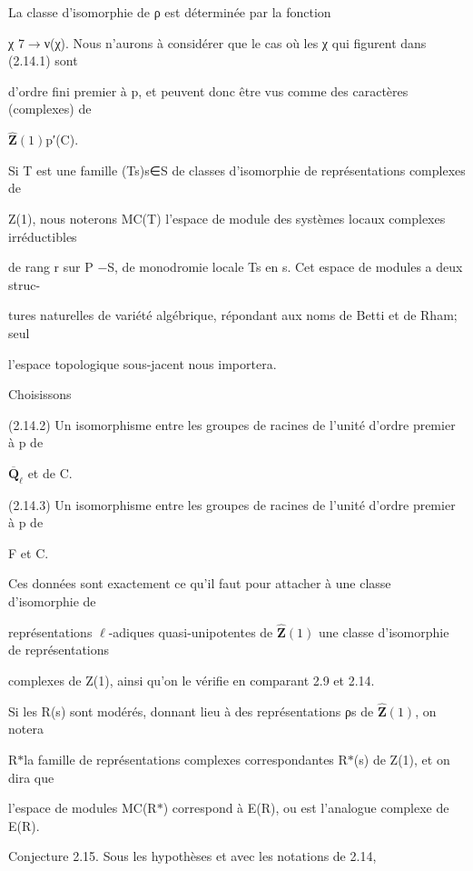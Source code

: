 \documentclass[11pt]{article}
\begin{document}
\noindent La classe d’isomorphie de ρ est déterminée par la fonction\par
\noindent χ 7\(\to\)ν(χ). Nous n’aurons à considérer que le cas où les χ qui figurent dans (2.14.1) sont\par
\noindent d’ordre fini premier à p, et peuvent donc être vus comme des caractères (complexes) de\par
\noindent \(\widehat{\mathbf Z}(1)\)p′(C).\par
\noindent Si T est une famille (Ts)s∈S de classes d’isomorphie de représentations complexes de\par
\noindent Z(1), nous noterons MC(T) l’espace de module des systèmes locaux complexes irréductibles\par
\noindent de rang r sur P −S, de monodromie locale Ts en s. Cet espace de modules a deux struc-\par
\noindent tures naturelles de variété algébrique, répondant aux noms de Betti et de Rham; seul\par
\noindent l’espace topologique sous-jacent nous importera.\par
\noindent Choisissons\par
\noindent (2.14.2) Un isomorphisme entre les groupes de racines de l’unité d’ordre premier à p de\par
\noindent \(\overline{\mathbf Q}_{\ell}\) et de C.\par
\noindent (2.14.3) Un isomorphisme entre les groupes de racines de l’unité d’ordre premier à p de\par
\noindent F et C.\par
\noindent Ces données sont exactement ce qu’il faut pour attacher à une classe d’isomorphie de\par
\noindent représentations \(\ell\)-adiques quasi-unipotentes de \(\widehat{\mathbf Z}(1)\) une classe d’isomorphie de représentations\par
\noindent complexes de Z(1), ainsi qu’on le vérifie en comparant 2.9 et 2.14.\par
\noindent Si les R(s) sont modérés, donnant lieu à des représentations ρs de \(\widehat{\mathbf Z}(1)\), on notera\par
\noindent R\(*\)la famille de représentations complexes correspondantes R\(*\)(s) de Z(1), et on dira que\par
\noindent l’espace de modules MC(R\(*\)) correspond à E(R), ou est l’analogue complexe de E(R).\par
\noindent Conjecture 2.15. Sous les hypothèses et avec les notations de 2.14,\par
\end{document}
